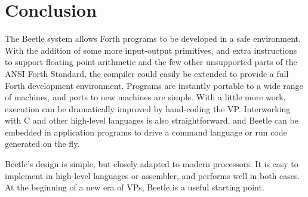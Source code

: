 \documentclass{article}
\begin{document}
\section{Conclusion}

The Beetle system allows Forth programs to be developed in a safe
environment. With the addition of some more input-output primitives, and
extra instructions to support floating point arithmetic and the few other
unsupported parts of the ANSI Forth Standard, the compiler could easily be
extended to provide a full Forth development environment. Programs are
instantly portable to a wide range of machines, and ports to new machines are
simple. With a little more work, execution can be dramatically improved by
hand-coding the VP. Interworking with C and other high-level languages is
also straightforward, and Beetle can be embedded in application programs to
drive a command language or run code generated on the fly.

Beetle's design is simple, but closely adapted to modern processors. It is
easy to implement in high-level languages or assembler, and performs well in
both cases. At the beginning of a new era of VPs, Beetle is a useful starting
point.





\end{document}

